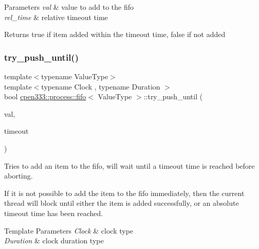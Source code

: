 \begin{DoxyParams}{Parameters}
{\em val} & value to add to the fifo \\
\hline
{\em rel\+\_\+time} & relative timeout time \\
\hline
\end{DoxyParams}
\begin{DoxyReturn}{Returns}
{\ttfamily true} if item added within the timeout time, {\ttfamily false} if not added 
\end{DoxyReturn}
\mbox{\label{classcpen333_1_1process_1_1fifo_abe9fee85225689f4104f263510814db0}} 
\subsubsection{\texorpdfstring{try\+\_\+push\+\_\+until()}{try\_push\_until()}}
{\footnotesize\ttfamily template$<$typename Value\+Type$>$ \\
template$<$typename Clock , typename Duration $>$ \\
bool \hyperlink{classcpen333_1_1process_1_1fifo}{cpen333\+::process\+::fifo}$<$ Value\+Type $>$\+::try\+\_\+push\+\_\+until (\begin{DoxyParamCaption}\item[{const Value\+Type \&}]{val,  }\item[{const std\+::chrono\+::time\+\_\+point$<$ Clock, Duration $>$ \&}]{timeout }\end{DoxyParamCaption})\hspace{0.3cm}{\ttfamily [inline]}}



Tries to add an item to the fifo, will wait until a timeout time is reached before aborting. 

If it is not possible to add the item to the fifo immediately, then the current thread will block until either the item is added successfully, or an absolute timeout time has been reached.


\begin{DoxyTemplParams}{Template Parameters}
{\em Clock} & clock type \\
\hline
{\em Duration} & clock duration type \\
\hline
\end{DoxyTemplParams}

